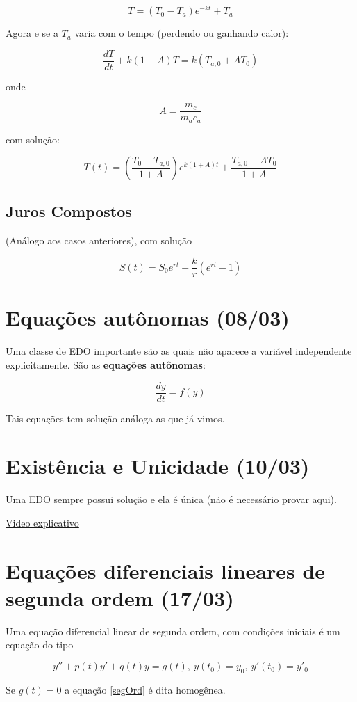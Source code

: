 \documentclass{article}
\begin{document}
$$T = (T_0 - T_a) e^{-k t} + T_a$$

Agora e se a $T_a$ varia com o tempo (perdendo ou ganhando calor):

$$\dfrac{d T}{d t} + k (1 + A) T = k (T_{a,0} + A T_0)$$

onde

$$A = \dfrac{m_c}{m_a c_a}$$

com solução:

$$T(t) = \left ( \dfrac{T_0 - T_{a, 0}}{1 + A} \right ) e^{k (1 + A) t} + \dfrac{T_{a, 0} + A T_0}{1 + A}$$

\subsection*{Juros Compostos}
(Análogo aos casos anteriores), com solução

$$S(t) = S_0 e^{r t} + \dfrac{k}{r} (e^{r t} - 1)$$

\section*{Equações autônomas (08/03)}
\label{s5}
Uma classe de EDO importante são as quais não aparece a variável independente explicitamente. São as \textbf{equações autônomas}:

$$\dfrac{d y}{d t} = f(y)$$

Tais equações tem solução análoga as que já vimos.

\section*{Existência e Unicidade (10/03)}
\label{s6}
Uma EDO sempre possui solução e ela é única (não é necessário provar aqui).

\href{https://www.youtube.com/watch?v=01FK-H7Kbpk&t=1s}{Video explicativo}

\section*{Equações diferenciais lineares de segunda ordem (17/03)}
\label{s7}
Uma equação diferencial linear de segunda ordem, com condições iniciais é um equação do tipo

\begin{equation}\label{segOrd}
    y'' + p(t) y' + q(t)y = g(t), \ y(t_0) = y_0, \ y'(t_0) = y'_0
\end{equation}

Se $g(t) = 0$ a equação \ref{segOrd} é dita homogênea.
\end{document}
